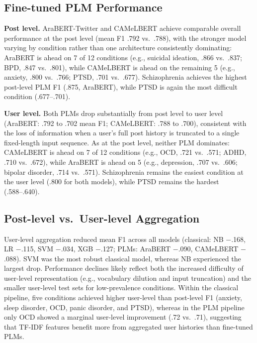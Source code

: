 \documentclass[11pt]{article}
\begin{document}
\subsection{Fine-tuned PLM Performance}

\textbf{Post level.} AraBERT-Twitter and CAMeLBERT achieve comparable overall performance at the post level (mean F1 .792 vs.\ .788), with the stronger model varying by condition rather than one architecture consistently dominating: AraBERT is ahead on 7 of 12 conditions (e.g., suicidal ideation, .866 vs.\ .837; BPD, .847 vs.\ .801), while CAMeLBERT is ahead on the remaining 5 (e.g., anxiety, .800 vs.\ .766; PTSD, .701 vs.\ .677). Schizophrenia achieves the highest post-level PLM F1 (.875, AraBERT), while PTSD is again the most difficult condition (.677--.701).

\textbf{User level.} Both PLMs drop substantially from post level to user level (AraBERT: .792 to .702 mean F1; CAMeLBERT: .788 to .700), consistent with the loss of information when a user's full post history is truncated to a single fixed-length input sequence. As at the post level, neither PLM dominates: CAMeLBERT is ahead on 7 of 12 conditions (e.g., OCD, .721 vs.\ .571; ADHD, .710 vs.\ .672), while AraBERT is ahead on 5 (e.g., depression, .707 vs.\ .606; bipolar disorder, .714 vs.\ .571). Schizophrenia remains the easiest condition at the user level (.800 for both models), while PTSD remains the hardest (.588--.640).

\subsection{Post-level vs.\ User-level Aggregation}

User-level aggregation reduced mean F1 across all models (classical: NB $-$.168, LR $-$.115, SVM $-$.034, XGB $-$.127; PLMs: AraBERT $-$.090, CAMeLBERT $-$.088). SVM was the most robust classical model, whereas NB experienced the largest drop. Performance declines likely reflect both the increased difficulty of user-level representation (e.g., vocabulary dilution and input truncation) and the smaller user-level test sets for low-prevalence conditions. Within the classical pipeline, five conditions achieved higher user-level than post-level F1 (anxiety, sleep disorder, OCD, panic disorder, and PTSD), whereas in the PLM pipeline only OCD showed a marginal user-level improvement (.72 vs.\ .71), suggesting that TF-IDF features benefit more from aggregated user histories than fine-tuned PLMs.
\end{document}
